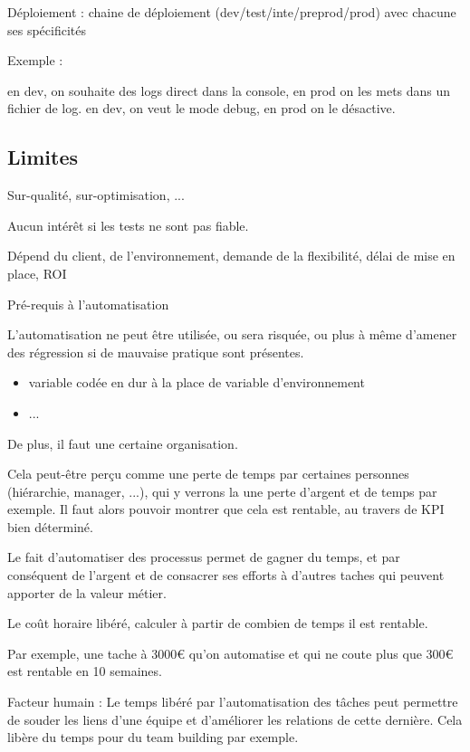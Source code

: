 Déploiement : chaine de déploiement (dev/test/inte/preprod/prod) avec chacune ses spécificités

Exemple :

en dev, on souhaite des logs direct dans la console, en prod on les mets dans un fichier de log.
en dev, on veut le mode debug, en prod on le désactive.

\subsection{Limites}


Sur-qualité, sur-optimisation, ...

Aucun intérêt si les tests ne sont pas fiable.

Dépend du client, de l'environnement, demande de la flexibilité, délai de mise en place, ROI

Pré-requis à l'automatisation

L'automatisation ne peut être utilisée, ou sera risquée, ou plus à même d'amener des régression si de mauvaise pratique sont présentes.

\begin{itemize}
	\item variable codée en dur à la place de variable d'environnement
	\item ...
\end{itemize}

De plus, il faut une certaine organisation.

Cela peut-être perçu comme une perte de temps par certaines personnes (hiérarchie, manager, ...), qui y verrons la une perte d'argent et de temps par exemple. Il faut alors pouvoir montrer que cela est rentable, au travers de \gls{KPI} bien déterminé.

Le fait d'automatiser des processus permet de gagner du temps, et par conséquent de l'argent et de consacrer ses efforts à d'autres taches qui peuvent apporter de la valeur métier.

Le coût horaire libéré, calculer à partir de combien de temps il est rentable.

Par exemple, une tache à 3000€ qu'on automatise et qui ne coute plus que 300€ est rentable en 10 semaines.

Facteur humain : Le temps libéré par l'automatisation des tâches peut permettre de souder les liens d'une équipe et d'améliorer les relations de cette dernière. Cela libère du temps pour du team building par exemple.

